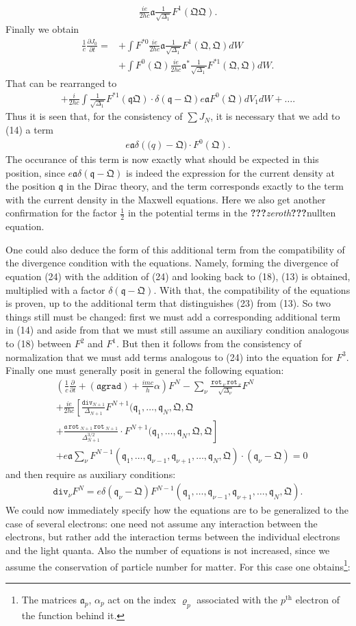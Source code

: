 \documentclass[a4paper,11pt]{article}
\newcommand{\WTF}[1]{\textbf{???}\textit{#1}\textbf{???}}
\newcommand{\?}[2]{#1\footnote{\textsc{Translator note}: #2}}
\newcommand{\nequ}[2]{\begin{align*}\tag{#1}#2\end{align*}}
\newcommand{\uequ}[1]{\begin{align*}#1\end{align*}}
\renewcommand{\operatorfont}[1]{\texttt{#1}}
\newcommand{\grad}{\operatorfont{grad}}
\renewcommand{\div}{\operatorfont{div}}
\newcommand{\rot}{\,\operatorfont{rot}\,}
\newcommand{\pXpY}[2]{\frac{\partial #1}{\partial #2}}
\newcommand{\mf}[1]{\mathfrak{#1}}
\newcommand{\Nth}[1]{{#1}^\text{th}}
\begin{document}
\uequ{
\frac{ie}{2hc}\mf{a}\frac{1}{\sqrt{\Delta_1}}F^1(\mf{QQ}).
}
Finally we obtain
\uequ{
\frac{1}{c}\pXpY{J_0}{t} = &+\int F^{*0} \frac{ie}{2hc}\mf{a}\frac{1}{\sqrt{\Delta_1}}F^1(\mf{Q},\mf{Q})dW\\
 & +\int F^{0}(\mf{Q}) \frac{ie}{2hc}\mf{a}^*\frac{1}{\sqrt{\Delta_1}}F^{*1}(\mf{Q},\mf{Q})dW.
}
That can be rearranged to
\uequ{
+\frac{i}{2hc}\int\frac{1}{\sqrt{\Delta_1}}F^{*1}(\mf{qQ})\cdot
\delta(\mf{q}-\mf{Q})e\mf{a} F^0(\mf{Q})dV_1 dW + \dots.
}
Thus it is seen that, for the consistency of $\sum J_N$, it is necessary that we add to (14) a term
\nequ{24}{
e\mf{a}\delta(\mf(q) - \mf{Q})\cdot F^0(\mf{Q}).
}
The occurance of this term is now exactly what should be expected in this position, since $e\mf{a}\delta(\mf{q} - \mf{Q})$ is indeed the expression for the current density at the position $\mf{q}$ in the Dirac theory, and the term corresponds exactly to the term with the current density in the Maxwell equations. Here we also get another confirmation for the factor $\frac{1}{2}$ in the potential terms in the \WTF{zeroth}{nullten} equation.

One could also deduce the form of this additional term from the compatibility of the divergence condition with the equations. Namely, forming the divergence of equation (24) with the addition of (24) and looking back to (18), (13) is obtained, multiplied with a factor $\delta(\mf{q} - \mf{Q})$. With that, the compatibility of the equations is proven, up to the additional term that distinguishes (23) from (13). So two things still must be changed: first we must add a corresponding  additional term in (14) and aside from that we must still assume an auxiliary condition analogous to (18) between $F^2$ and $F^1$. But then it follows from the consistency of normalization that we must add terms analogous to (24) into the equation for $F^3$. Finally one must generally posit in general the following equation:
\nequ{25}{
&\left(\frac{1}{c}\pXpY{}{t} + (\mf{a}\grad) + \frac{imc}{h}\alpha\right)F^N - 
\sum\limits_\nu\frac{\rot_\nu \rot_\nu}{\sqrt{\Delta_\nu}}F^N\\
&+\frac{ie}{2hc}\left[\frac{\div_{N+1}}{\Delta_{N+1}}F^{N+1}
(\mf{q}_1,\dots,\mf{q}_N,\mf{Q},\mf{Q}\right.\\
&\left.+\frac{\mf{a}\rot_{N+1}\rot_{N+1}}{\Delta_{N+1}^{3/2}}\cdot F^{N+1}
(\mf{q}_1,\dots,\mf{q}_N,\mf{Q},\mf{Q}\right]\\
&+e\mf{a}\sum\limits_\nu F^{N-1}(\mf{q}_1,\dots,\mf{q}_{\nu-1},\mf{q}_{\nu+1},\dots,\mf{q}_N,\mf{Q})\cdot(\mf{q}_\nu-\mf{Q})=0
}
and then require as auxiliary conditions:
\nequ{25a}{
\div_\nu F^N = e\delta(\mf{q}_\nu-\mf{Q})F^{N-1}(\mf{q}_1,\dots,\mf{q}_{\nu-1},\mf{q}_{\nu+1},\dots,\mf{q}_N,\mf{Q}).
}
We could now immediately specify how the equations are to be generalized to the case of several electrons: one need not assume any interaction between the electrons, but rather add the interaction terms between the individual electrons and the light quanta. Also the number of equations is not increased, since we assume the conservation of particle number for matter. For this case one obtains\footnote{The matrices $\mf{a}_p$, $\alpha_p$ act on the index $\varrho_p$ associated with the $\Nth{p}$ electron of the function behind it.}:
\end{document}
